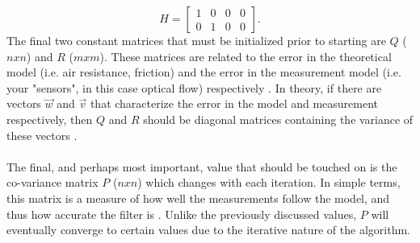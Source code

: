 \documentclass[11pt]{article} %
\begin{document}
\begin{equation}
H = \begin{bmatrix}
1 & 0 & 0 & 0 \\
0 & 1 & 0 & 0 
\end{bmatrix}.
\end{equation}
The final two constant matrices that must be initialized prior to starting are $Q$ ($nxn$) and $R$ ($mxm$). These matrices are related to the error in the theoretical model (i.e. air resistance, friction) and the error in the measurement model (i.e. your "sensors", in this case optical flow) respectively \cite{12}. In theory, if there are vectors $\vec{w}$ and $\vec{v}$ that characterize the error in the model and measurement respectively, then $Q$ and $R$ should be diagonal matrices containing the variance of these vectors \cite{4}. \\\\
The final, and perhaps most important, value that should be touched on is the co-variance matrix $P$ ($nxn$) which changes with each iteration. In simple terms, this matrix is a measure of how well the measurements follow the model, and thus how accurate the filter is \cite{12}. Unlike the previously discussed values, $P$ will eventually converge to certain values due to the iterative nature of the algorithm.
\end{document}
